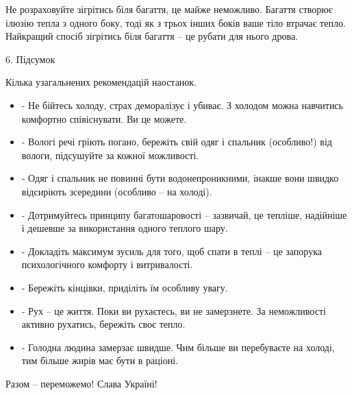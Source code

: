 Не розраховуйте зігрітись біля багаття, це майже неможливо. Багаття створює
ілюзію тепла з одного боку, тоді як з трьох інших боків ваше тіло втрачає
тепло. Найкращий спосіб зігрітись біля багаття – це рубати для нього дрова.

6. Підсумок

Кілька узагальнених рекомендацій наостанок.

\begin{itemize}
  \item - Не бійтесь холоду, страх деморалізує і убиває. З холодом можна навчитись комфортно співіснувати. Ви це можете.
  \item - Вологі речі гріють погано, бережіть свій одяг і спальник (особливо!) від вологи, підсушуйте за кожної можливості.
  \item - Одяг і спальник не повинні бути водонепроникними, інакше вони швидко відсиріють зсередини (особливо – на холоді).
  \item - Дотримуйтесь принципу багатошаровості – зазвичай, це тепліше, надійніше і дешевше за використання одного теплого шару.
  \item - Докладіть максимум зусиль для того, щоб спати в теплі – це запорука психологічного комфорту і витривалості.
  \item - Бережіть кінцівки, приділіть їм особливу увагу.
  \item - Рух – це життя. Поки ви рухаєтесь, ви не замерзнете. За неможливості активно рухатись, бережіть своє тепло.
  \item - Голодна людина замерзає швидше. Чим більше ви перебуваєте на холоді, тим більше жирів має бути в раціоні.
\end{itemize}

Разом – переможемо! Слава Україні!

